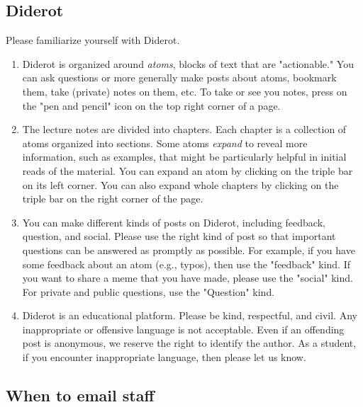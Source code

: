\subsection{Diderot}

\begin{gram}
Please familiarize yourself with Diderot.  

\begin{enumerate}
%
\item Diderot is organized around \emph{atoms}, blocks of text that
  are "actionable."  You can ask questions or more generally make
  posts about atoms, bookmark them, take (private) notes on them, etc.
  To take or see you notes, press on the "pen and pencil" icon on the
  top right corner of a page.

\item The lecture notes are divided into chapters. Each chapter is a
  collection of atoms organized into sections.  Some atoms
  \emph{expand} to reveal more information, such as examples, that
  might be particularly helpful in initial reads of the material.  You
  can expand an atom by clicking on the triple bar on its left corner.
  You can also expand whole chapters by clicking on the triple bar on
  the right corner of the page.

\item You can make different kinds of posts on Diderot, including
  feedback, question, and social.  Please use the right kind of post
  so that important questions can be answered as promptly as possible.
  For example, if you have some feedback about an atom (e.g., typos),
  then use the "feedback" kind.  If you want to share a meme that you
  have made, please use the "social" kind.  For private and public
  questions, use the "Question" kind.

\item Diderot is an educational platform.  Please be kind, respectful,
  and civil.  Any inappropriate or offensive language is not
  acceptable.  Even if an offending post is anonymous, we reserve the
  right to identify the author. As a student, if you encounter
  inappropriate language, then please let us know.
\end{enumerate}
\end{gram}

\subsection{When to email staff}

